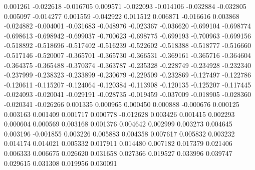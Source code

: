 0.001261
-0.022618
-0.016705
0.009571
-0.022093
-0.014106
-0.032884
-0.032805
0.005097
-0.014277
0.001559
-0.042922
0.011512
0.006871
-0.016616
0.003868
-0.024882
-0.004001
-0.031683
-0.048976
-0.023367
-0.036620
-0.699104
-0.698774
-0.698613
-0.698942
-0.699037
-0.700623
-0.698775
-0.699193
-0.700963
-0.699156
-0.518892
-0.518696
-0.517402
-0.516239
-0.522602
-0.518388
-0.518777
-0.516660
-0.517146
-0.520007
-0.365701
-0.365730
-0.366531
-0.369161
-0.365716
-0.364604
-0.364375
-0.365488
-0.370374
-0.363787
-0.235328
-0.228749
-0.234928
-0.232340
-0.237999
-0.238323
-0.233899
-0.230679
-0.229509
-0.232869
-0.127497
-0.122786
-0.120611
-0.115207
-0.124064
-0.120384
-0.113908
-0.120135
-0.125207
-0.117445
-0.024093
-0.020041
-0.029191
-0.028735
-0.019459
-0.037009
-0.018905
-0.028360
-0.020341
-0.026266
0.001335
0.000965
0.000450
0.000888
-0.000676
0.000125
0.003163
0.001409
0.001717
0.000778
-0.012628
0.003426
0.001415
0.002293
0.000604
0.000569
0.003168
0.001376
0.004642
0.002999
0.003273
0.004645
0.003196
-0.001855
0.003226
0.005883
0.004358
0.007617
0.005832
0.003232
0.014174
0.014021
0.005332
0.017911
0.014480
0.007182
0.017379
0.021406
0.006333
0.006675
0.026620
0.031658
0.027366
0.019527
0.033996
0.039747
0.029615
0.031308
0.019956
0.030091
